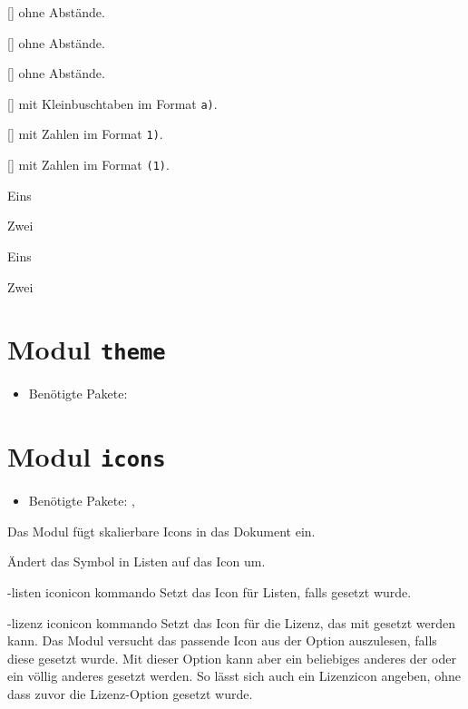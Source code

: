 \begin{environments}
	[]
	 ohne Abstände.

	[]
	 ohne Abstände.

	[]
	 ohne Abstände.

	[]
	 mit Kleinbuschtaben im Format \texttt{a)}.

	[]
	 mit Zahlen im Format \texttt{1)}.

	[]
	 mit Zahlen im Format \texttt{(1)}.
\end{environments}

\begin{example}
  \begin{smallitem}
    \item Eins
    \item Zwei
  \end{smallitem}
  \begin{enuma}
    \item Eins
    \item Zwei
  \end{enuma}
\end{example}

\section{Modul \texttt{theme}}\label{sec:modul-theme}
\begin{itemize}
	\item Benötigte Pakete:
\end{itemize}

\section{Modul \texttt{icons}}\label{sec:modul-icons}
\begin{itemize}
	\item Benötigte Pakete: , 
\end{itemize}

Das Modul  fügt skalierbare Icons in das Dokument ein.

\begin{options}
	Ändert das Symbol in  Listen auf das
	Icon  um.

	\keyval-{listen icon}{icon kommando}
	Setzt das Icon für  Listen, falls 
	gesetzt wurde.

	\keyval-{lizenz icon}{icon kommando}
	Setzt das Icon für die Lizenz, das mit  gesetzt werden kann.
	Das Modul versucht das passende Icon aus der  Option auszulesen,
	falls diese gesetzt wurde. Mit dieser Option kann aber ein beliebiges anderes
	der  oder ein völlig anderes gesetzt werden. So lässt sich auch
	ein Lizenzicon angeben, ohne dass zuvor die Lizenz-Option gesetzt wurde.
\end{options}

